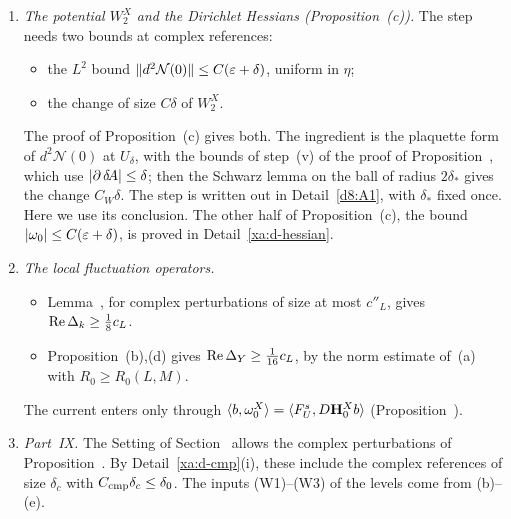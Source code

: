 \begin{detail}
\begin{enumerate}[label=(\alph*)]
\begin{itemize}
    \[
    C\delta S_{\gamma/4}\le\tfrac c2 .
    \]
    This condition is one of the radius conditions fixed with $\delta_*$ (Detail~\ref{xa:d-deltaP}, (P1)).
  \item Then $\boldsymbol\Gamma^X$ exists, with $\Rea$-coercivity $\frac c2$, and $\bH^X,\bC^X$ follow by composition.
  \end{itemize}
\item \emph{The potential $W_2^X$ and the Dirichlet Hessians (Proposition~(c)).} The step needs two bounds at complex references:
  \begin{itemize}
  \item the $L^2$ bound $\lVert d^2\mathcal N(0)\rVert\le C(\varepsilon+\delta)$, uniform in $\eta$;
  \item the change of size $C\delta$ of $W_2^X$.
  \end{itemize}
  The proof of Proposition~(c) gives both. The ingredient is the plaquette form of $d^2\mathcal N(0)$ at $U_\delta$, with the bounds of step~(v) of the proof of Proposition~, which use $\lvert\partial\,\delta\!A\rvert\le\delta$; then the Schwarz lemma on the ball of radius $2\delta_*$ gives the change $C_W\delta$. The step is written out in Detail~\ref{d8:A1}, with $\delta_*$ fixed once. Here we use its conclusion. The other half of Proposition~(c), the bound $\lvert\omega_0\rvert\le C(\varepsilon+\delta)$, is proved in Detail~\ref{xa:d-hessian}.
\item \emph{The local fluctuation operators.}
  \begin{itemize}
  \item Lemma~, for complex perturbations of size at most $c''_L$, gives $\operatorname{Re}\Delta_k\ge\frac18c_L$.
  \item Proposition~(b),(d) gives $\operatorname{Re}\Delta_Y\ge\frac1{16}c_L$, by the norm estimate of~(a) with $R_0\ge R_0(L,M)$.
  \end{itemize}
  The current enters only through $\langle b,\omega_0^X\rangle=\langle F^s_U,D\mathbf H^X_0b\rangle$ (Proposition~).
\item \emph{Part~IX.} The Setting of Section~ allows the complex perturbations of Proposition~. By Detail~\ref{xa:d-cmp}(i), these include the complex references of size $\delta_c$ with $C_{\rm cmp}\delta_c\le\delta_0$. The inputs (W1)--(W3) of the levels come from (b)--(e).
\end{enumerate}
\end{detail}

